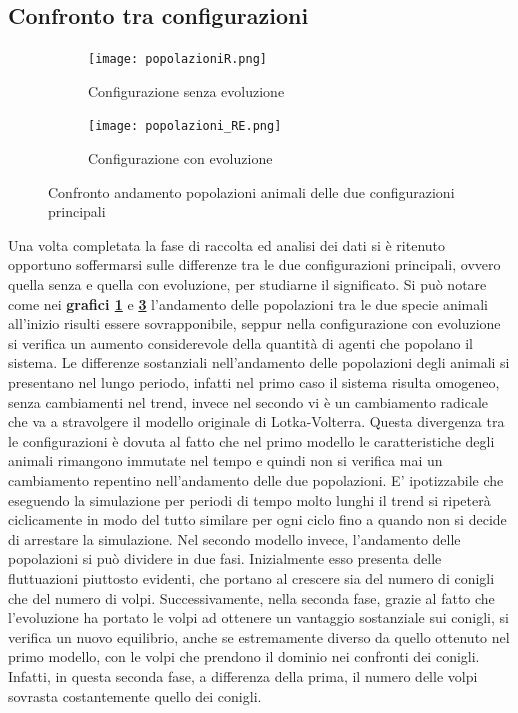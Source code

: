 \documentclass[11pt]{article}
\begin{document}
\newpage

\subsection{Confronto tra configurazioni}

\begin{figure}[]

\begin{subfigure}{\textwidth}
		\centering
     \texttt{[image: popolazioniR.png]}
     \caption{Configurazione senza evoluzione}
     \label{fig:conigliVolpiReintroduzione1}
	\end{subfigure}
	\begin{subfigure}{\textwidth}
		\centering
     \texttt{[image: popolazioni\_RE.png]}
     \caption{Configurazione con evoluzione}
     \label{fig:conigliVolpiRE1}
	\end{subfigure}
	\caption{Confronto andamento popolazioni animali delle due configurazioni principali}
\end{figure}


Una volta completata la fase di raccolta ed analisi dei dati si è ritenuto opportuno soffermarsi sulle differenze tra le due configurazioni principali, ovvero quella senza e quella con evoluzione, per studiarne il significato. Si può notare come nei \textbf{grafici \ref{fig:conigliVolpiReintroduzione1}} e \textbf{\ref{fig:conigliVolpiRE1}} l'andamento delle popolazioni tra le due specie animali all'inizio risulti essere sovrapponibile, seppur nella configurazione con evoluzione si verifica un aumento considerevole della quantità di agenti che popolano il sistema. Le differenze sostanziali nell'andamento delle popolazioni degli animali si presentano nel lungo periodo, infatti nel primo caso il sistema risulta omogeneo, senza cambiamenti nel trend, invece nel secondo vi è un cambiamento radicale  che va a stravolgere il modello originale di Lotka-Volterra. Questa divergenza tra le configurazioni è dovuta al fatto che nel primo modello le caratteristiche degli animali rimangono immutate nel tempo e quindi non si verifica mai un cambiamento repentino nell'andamento delle due popolazioni. E' ipotizzabile che eseguendo la simulazione per periodi di tempo molto lunghi il trend si ripeterà ciclicamente in modo del tutto similare per ogni ciclo fino a quando non si decide di arrestare la simulazione. Nel secondo modello invece, l'andamento delle popolazioni si può dividere in due fasi. Inizialmente esso presenta delle fluttuazioni piuttosto evidenti, che portano al crescere sia del numero di conigli che del numero di volpi. Successivamente, nella seconda fase, grazie al fatto che l'evoluzione  ha portato le volpi ad ottenere un vantaggio sostanziale sui conigli, si verifica un nuovo equilibrio, anche se estremamente diverso da quello ottenuto nel primo modello, con le volpi che prendono il dominio nei confronti dei conigli. Infatti, in questa seconda fase, a differenza della prima, il numero delle volpi sovrasta costantemente quello dei conigli.
\end{document}
